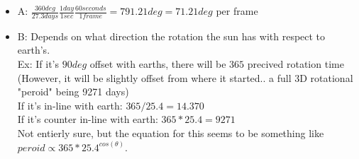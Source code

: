 \begin{itemize}

\item A:
$\frac{360deg}{27.3days} \frac{1day}{1sec} \frac{60 seconds}{1 frame} = 791.21 deg= 71.21 deg$ per frame

\item B:
Depends on what direction the rotation the sun has with respect to earth's. \\
Ex: If it's $90 deg$ offset with earths, there will be $365$ precived rotation time (However, it will be slightly offset from where it started.. a full 3D rotational "peroid" being 9271 days) \\
If it's in-line with earth: $365/25.4 = 14.370$ \\
If it's counter in-line with earth: $365*25.4 = 9271$ \\

Not entierly sure, but the equation for this seems to be something like $peroid \propto 365* 25.4^{cos(\theta)}$.
\end{itemize}
